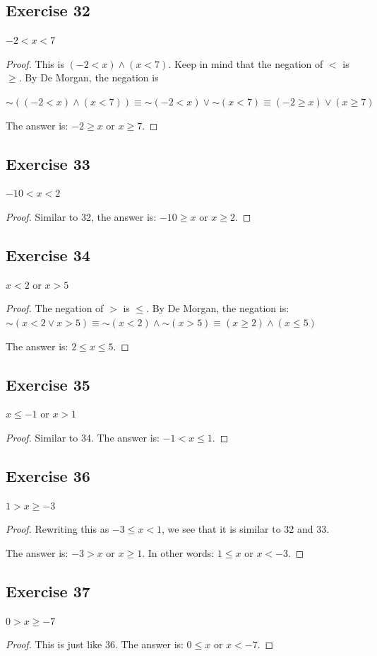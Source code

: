 \documentclass[14pt]{extarticle}
\begin{document}
\subsection{Exercise 32} $-2 < x < 7$
\begin{proof} This is $(-2 < x) \wedge (x < 7)$. Keep in mind that the negation
of $<$ is $\geq$. By De Morgan, the negation is

$\sim((-2 < x) \wedge (x < 7)) \equiv {\sim(-2 < x)} \vee {\sim(x < 7)} \equiv
(-2 \geq x) \vee (x \geq 7)$

The answer is: $-2 \geq x$ or $x \geq 7$. \end{proof}
\subsection{Exercise 33} $-10 < x < 2$
\begin{proof} Similar to 32, the answer is: $-10 \geq x$ or $x \geq 2$.
\end{proof}

\subsection{Exercise 34} $x < 2$ or $x > 5$
\begin{proof} The negation of $>$ is $\leq$. By De Morgan, the negation is:
${\sim(x < 2 \vee x > 5)} \equiv {\sim (x < 2)} \wedge {\sim (x > 5)} \equiv (x
\geq 2) \wedge (x \leq 5)$

The answer is: $2 \leq x \leq 5$. \end{proof}
\subsection{Exercise 35} $x \leq -1$ or $x > 1$
\begin{proof} Similar to 34. The answer is: $-1 < x \leq 1$. \end{proof}
\subsection{Exercise 36} $1 > x \geq -3$
\begin{proof} Rewriting this as $-3 \leq x < 1$, we see that it is similar to 32
and 33.

The answer is: $-3 > x$ or $x \geq 1$. In other words: $1 \leq x$ or $x < -3$.
\end{proof}

\subsection{Exercise 37} $0 > x \geq -7$
\begin{proof} This is just like 36. The answer is: $0 \leq x$ or $x < -7$.
\end{proof}
\end{document}
